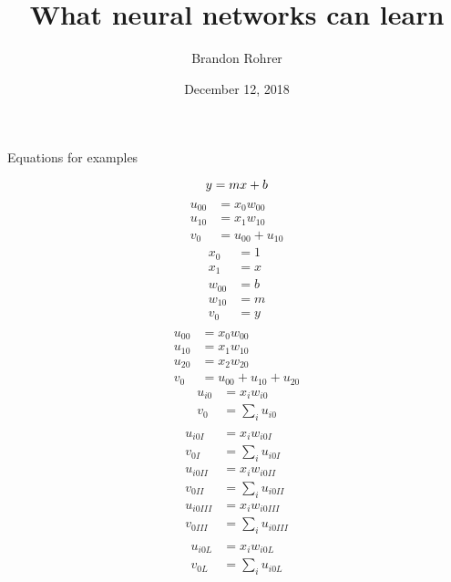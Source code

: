 \documentclass{article}[12pt]
\title{What neural networks can learn}
\author{Brandon Rohrer}
\date{December 12, 2018}
\begin{document}
   \maketitle
   Equations for examples

    \huge    
    \begin{equation*}
        y = m x + b \\
    \end{equation*}
    \begin{align*}
        u_{00} & = x_0 w_{00} \\
        u_{10} & = x_1 w_{10} \\
        v_0 & = u_{00} + u_{10} 
    \end{align*}
    \begin{align*}
        x_0 &= 1\\
        x_1 &= x\\
        w_{00} &= b\\
        w_{10} &= m\\
        v_0 &= y\\
    \end{align*}
    \begin{align*}
        u_{00} & = x_0 w_{00} \\
        u_{10} & = x_1 w_{10} \\
        u_{20} & = x_2 w_{20} \\
        v_0 & = u_{00} + u_{10} + u_{20} 
    \end{align*}
    \begin{align*}
        u_{i0} & = x_i w_{i0} \\
        v_{0} & = \sum_i u_{i0} \\
    \end{align*}
    \begin{align*}
        u_{i0I} & = x_i w_{i0I} \\
        v_{0I} & = \sum_i u_{i0I} \\
        u_{i0II} & = x_i w_{i0II} \\
        v_{0II} & = \sum_i u_{i0II} \\
        u_{i0III} & = x_i w_{i0III} \\
        v_{0III} & = \sum_i u_{i0III} \\
    \end{align*}
    \begin{align*}
        u_{i0L} & = x_i w_{i0L} \\
        v_{0L} & = \sum_i u_{i0L} \\
    \end{align*}
\end{document}
